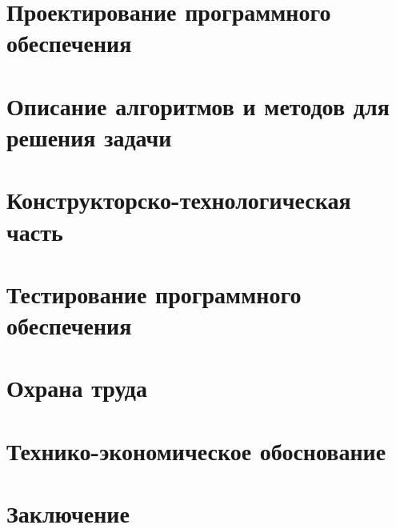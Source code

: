 




\newpage
{}
\renewcommand\contentsname{\hfill Содержание \hfill}
\tableofcontents

\setcounter{figure}{0}
\section{Проектирование программного обеспечения}

\setcounter{figure}{0}
\section{Описание алгоритмов и методов для решения задачи}

\setcounter{figure}{0}
\section{Конструкторско-технологическая часть}

\setcounter{figure}{0}
\section{Тестирование программного обеспечения}

\setcounter{figure}{0}
\section{Охрана труда}

\setcounter{figure}{0}
\section{Технико-экономическое обоснование}

\setcounter{figure}{0}
\section{Заключение}

\newpage
\renewcommand{\refname}{Список использованных источников}

%
